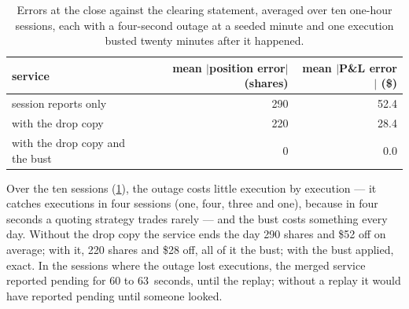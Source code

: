 \begin{table}[ht]
\centering\small
\begin{tabular}{lrr}
\toprule
service & mean $|$position error$|$ (shares) & mean $|$P\&L error$|$ (\$) \\
\midrule
session reports only & 290 & 52.4 \\
with the drop copy & 220 & 28.4 \\
with the drop copy and the bust & 0 & 0.0 \\
\bottomrule
\end{tabular}
\caption{Errors at the close against the clearing statement, averaged over ten one-hour sessions, each with a four-second outage at a seeded
minute and one execution busted twenty minutes after it happened.}\label{tab:pl:position-and-pnl-services:close}
\end{table}

Over the ten sessions (\cref{tab:pl:position-and-pnl-services:close}), the outage costs little execution by execution --- it catches
executions in four sessions (one, four, three and one), because in four seconds a quoting strategy trades rarely --- and the bust costs
something every day. Without the drop copy the service ends the day 290 shares and \$52 off on average; with it, 220 shares and \$28 off, all
of it the bust; with the bust applied, exact. In the sessions where the outage lost executions, the merged service reported pending for 60 to
63~seconds, until the replay; without a replay it would have reported pending until someone looked.

\begin{omfigure}

\label{fig:pl:position-and-pnl-services:close}
\end{omfigure}


